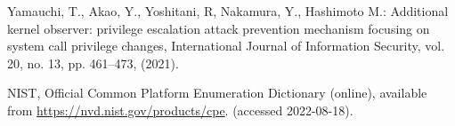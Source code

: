\documentclass[paper]{ieice}
\begin{document}
\begin{thebibliography}{99}
  Yamauchi, T., Akao, Y., Yoshitani, R, Nakamura, Y., Hashimoto M.: Additional kernel observer: privilege escalation attack prevention mechanism focusing on system call privilege changes, International Journal of Information Security, vol. 20, no. 13, pp. 461--473, (2021).

  NIST, Official Common Platform Enumeration Dictionary (online), 
  available from
  \url{https://nvd.nist.gov/products/cpe}.  (accessed 2022-08-18).


\end{thebibliography}
\end{document}
